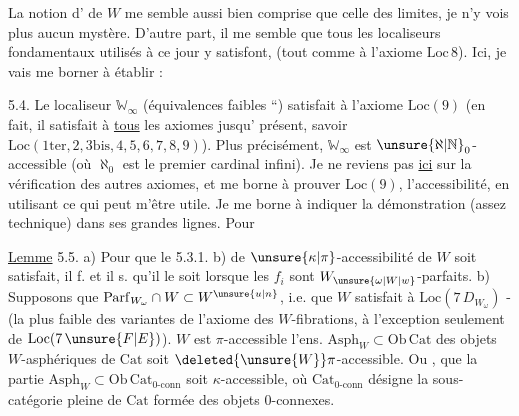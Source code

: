 La notion d' de $W$ me semble aussi bien comprise que celle des limites, je n'y vois plus aucun mystère. D'autre part, il me semble que tous les localiseurs fondamentaux utilisés à ce jour y satisfont, (tout comme à l'axiome $\mathrm{Loc}\,8$).  Ici, je vais me borner à établir :

\uline{}  5.4. Le localiseur  $\mathbb W_\infty$ (équivalences faibles ``) satisfait à l'axiome $\mathrm{Loc}(9)$ (en fait, il satisfait à \uline{tous} les axiomes  jusqu' présent, savoir $\mathrm{Loc}(1\mathrm{ter},2,3\mathrm{bis},4,5,6,7,8,9)$).
Plus précisément, $\mathbb W_\infty$ est $\unsure{\aleph|\mathbb N}_0$-accessible (où $\aleph_0$ est le premier cardinal infini).
Je ne reviens pas \uline{ici} sur la vérification des autres axiomes, et me borne à prouver $\mathrm{Loc}(9)$, l'accessibilité, en utilisant ce qui peut m'être utile. Je me
borne à indiquer la démonstration (assez technique) dans ses grandes lignes. Pour 

\uline{Lemme} 5.5. a) Pour que le   5.3.1. b) de $\unsure{\kappa|\pi}$-accessibilité de $W$ soit satisfait, il f. et il s. qu'il le soit lorsque les $f_i$ sont $W_{\unsure{\omega|W|w}}$-parfaits.
b) Supposons que $\mathrm{Parf}_{W_\omega}\cap W\subset W^{\unsure{u|n}}$, i.e. que $W$ satisfait à $\mathrm{Loc}(7\,D_{W_\omega})$ - (la plus faible des variantes de l'axiome des $W$-fibrations, à l'exception seulement de $\mathrm{Loc}(7\,\unsure{F|E})$).   $W$ est $\pi$-accessible  l'ens. $\mathrm{Asph}_W\subset\mathrm{Ob}\,\mathrm{Cat}$ des objets $W$-asphériques de $\mathrm{Cat}$ soit $\deleted{\unsure{W}}\pi$-accessible.  Ou , que  la partie $\mathrm{Asph}_W\subset\mathrm{Ob}\,\mathrm{Cat}_{0\text{-conn}}$ soit $\kappa$-accessible, où $\mathrm{Cat}_{0\text{-conn}}$ désigne la sous-catégorie pleine de $\mathrm{Cat}$ formée des objets $0$-connexes.

